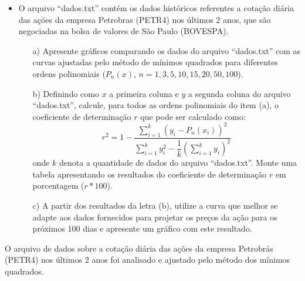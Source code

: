 \documentclass{article}
\newcounter{execs}
\newcommand{\exec}[0]{\addtocounter{execs}{1}\item[\textbf{\arabic{execs}.}]}
\begin{document}
\thispagestyle{first}
%    

\begin{itemize}

\exec O arquivo ``dados.txt'' contém os dados históricos referentes a cotação diária das ações da empresa Petrobras (PETR4) nos últimos 2 anos, que são negociadas na bolsa de valores de São Paulo (BOVESPA). 

\begin{itemize}

\item[a)] Apresente gráficos comparando os dados do arquivo ``dados.txt'' com as curvas ajustadas pelo método de mínimos quadrados para diferentes ordens polinomiais ($P_n(x)$, $n=1,3,5,10,15,20,50,100$).

\item[b)] Definindo como $x$ a primeira coluna e $y$ a segunda coluna do arquivo ``dados.txt'', calcule, para todos as ordens polinomiais do item (a), o coeficiente de determinação $r$ que pode ser calculado como:
$$
r^2= 1 - \dfrac{\displaystyle \sum_{i=1}^{k} \left(y_i-P_n(x_i) \right)^2}{\displaystyle \sum_{i=1}^{k} y_i^2 - \dfrac{1}{k} \left(\sum_{i=1}^{k} y_i \right)^2 }
$$
onde $k$ denota a quantidade de dados do arquivo ``dados.txt''. Monte uma tabela apresentando os resultados do coeficiente de determinação $r$ em porcentagem ($r*100$).

\item[c)] A partir dos resultados da letra (b), utilize a curva que melhor se adapte aos dados fornecidos para projetar os preços da ação para os próximos 100 dias e apresente um gráfico com este resultado. 

\end{itemize}

\end{itemize}

\newpage

O arquivo de dados sobre a cotação diária das ações da empresa Petrobrás (PETR4) nos últimos 2 anos foi analisado e ajustado pelo método dos mínimos quadrados.
\end{document}
